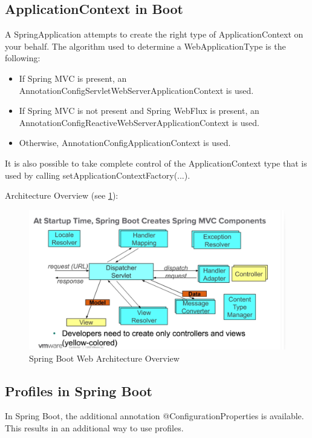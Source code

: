 \documentclass{scrartcl}
\begin{document}
\subsection{ApplicationContext in Boot}

A SpringApplication attempts to create the right type of ApplicationContext on your behalf. The algorithm used to determine a WebApplicationType is the following:

\begin{itemize}
    \item If Spring MVC is present, an AnnotationConfigServletWebServerApplicationContext is used.
    \item If Spring MVC is not present and Spring WebFlux is present, an AnnotationConfigReactiveWebServerApplicationContext is used.
    \item Otherwise, AnnotationConfigApplicationContext is used.
\end{itemize}

It is also possible to take complete control of the ApplicationContext type that is used by calling setApplicationContextFactory(...).


Architecture Overview (see \ref{fig:spring-web}):

\begin{figure}[h]
    \centering
    \includegraphics[width=1\linewidth]{spring-web}
    \caption{Spring Boot Web Architecture Overview}
    \label{fig:spring-web}
\end{figure}


\subsection{Profiles in Spring Boot}

In Spring Boot, the additional annotation @ConfigurationProperties is available. This results in an additional way to use profiles.
\end{document}
